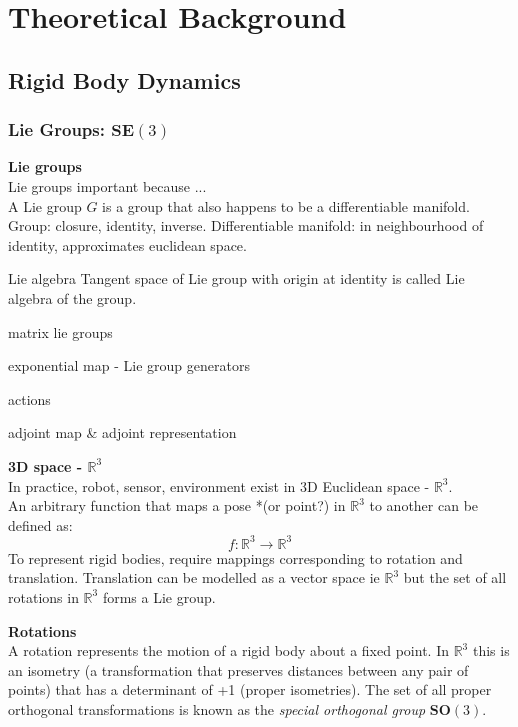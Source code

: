 \section{Theoretical Background}

\subsection{Rigid Body Dynamics}
	\subsubsection{Lie Groups: $\textbf{SE}(3)$}		
		\textbf{Lie groups}\\
		Lie groups important because ...\\
		A Lie group $G$ is a group that also happens to be a differentiable manifold.
		Group: closure, identity, inverse.
		Differentiable manifold: in neighbourhood of identity, approximates euclidean space.
		
		Lie algebra
		Tangent space of Lie group with origin at identity is called Lie algebra of the group.
		
		matrix lie groups
		
		exponential map - Lie group generators
		
		actions
		
		adjoint map \& adjoint representation
		
		\textbf{3D space - $\mathbb{R}^3$}\\
		In practice, robot, sensor, environment exist in 3D Euclidean space - $\mathbb{R}^3$.\\
		An arbitrary function that maps a pose *(or point?) in $\mathbb{R}^3$ to another can be defined as:
		\begin{equation}
		f: \mathbb{R}^3 \rightarrow \mathbb{R}^3
		\end{equation}
		To represent rigid bodies, require mappings corresponding to rotation and translation. Translation can be modelled as a vector space ie $\mathbb{R}^3$ but the set of all rotations in $\mathbb{R}^3$ forms a Lie group.
		
		\textbf{Rotations}\\
		A rotation represents the motion of a rigid body about a fixed point. In $\mathbb{R}^3$ this is an isometry (a transformation that preserves distances between any pair of points) that has a determinant of +1 (proper isometries). The set of all proper orthogonal transformations is known as the \textit{special orthogonal group} $\textbf{SO}(3)$.
		
